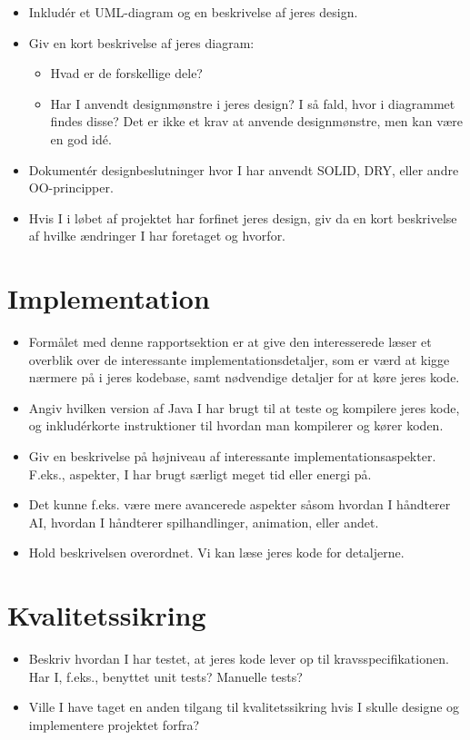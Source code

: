 \documentclass{article}
\theoremstyle{mytheoremstyle}
\theoremstyle{mytheoremstyle}
\theoremstyle{myproblemstyle}
\begin{document}
\begin{itemize}
  \item Inkludér et UML-diagram og en beskrivelse af jeres design.
  \item Giv en kort beskrivelse af jeres diagram:
  \begin{itemize}
    \item Hvad er de forskellige dele?
    \item Har I anvendt designmønstre i jeres design? I så fald, hvor i
    diagrammet findes disse? Det er ikke et krav at anvende designmønstre, men
    kan være en god idé.
  \end{itemize}
  \item Dokumentér designbeslutninger hvor I har anvendt SOLID, DRY, eller andre
  OO-principper. 
  \item Hvis I i løbet af projektet har forfinet jeres design,
  giv da en kort beskrivelse af hvilke ændringer I har foretaget og hvorfor.
\end{itemize}

\section{Implementation}\label{sec:Implementation} %
\begin{itemize}
  \item Formålet med denne rapportsektion er at give den interesserede læser et
  overblik over de interessante implementationsdetaljer, som er værd at kigge
  nærmere på i jeres kodebase, samt nødvendige detaljer for at køre jeres kode.
  \item Angiv hvilken version af Java I har brugt til at teste og kompilere
  jeres kode, og inkludérkorte instruktioner til hvordan man kompilerer og kører
  koden.
  \item Giv en beskrivelse på højniveau af interessante implementationsaspekter.
  F.eks., aspekter, I har brugt særligt meget tid eller energi på.
  \item Det kunne f.eks. være mere avancerede aspekter såsom hvordan I håndterer
  AI, hvordan I håndterer spilhandlinger, animation, eller andet.
  \item Hold beskrivelsen overordnet. Vi kan læse jeres kode for detaljerne.
\end{itemize}

\section{Kvalitetssikring}\label{sec:Kvalitetssikring} %
\begin{itemize}
  \item Beskriv hvordan I har testet, at jeres kode lever op til
  kravsspecifikationen. Har I, f.eks., benyttet unit tests? Manuelle tests?
  \item Ville I have taget en anden tilgang til kvalitetssikring hvis I skulle
  designe og implementere projektet forfra?
\end{itemize}
\end{document}
